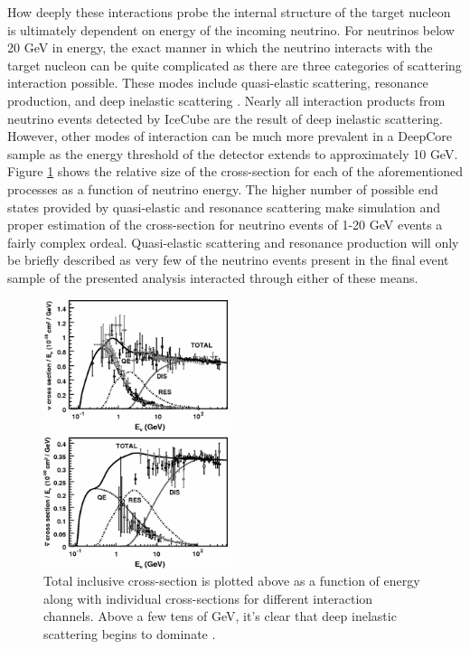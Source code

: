 \documentclass{gatech-thesis}
\begin{document}
How deeply these interactions probe the internal structure of the target nucleon is ultimately dependent on energy of the incoming neutrino. For neutrinos below 20 GeV in energy, the exact manner in which the neutrino interacts with the target nucleon can be quite complicated as there are three categories of scattering interaction possible. These modes include quasi-elastic scattering, resonance production, and deep inelastic scattering \cite{2012RvMP...84.1307F}. Nearly all interaction products from neutrino events detected by IceCube are the result of deep inelastic scattering. However, other modes of interaction can be much more prevalent in a DeepCore sample as the energy threshold of the detector extends to approximately 10 GeV. Figure \ref{fig:neutrino_scattering} shows the relative size of the cross-section for each of the aforementioned processes as a function of neutrino energy. The higher number of possible end states provided by quasi-elastic and resonance scattering make simulation and proper estimation of the cross-section for neutrino events of 1-20 GeV events a fairly complex ordeal. Quasi-elastic scattering and resonance production will only be briefly described as very few of the neutrino events present in the final event sample of the presented analysis interacted through either of these means.

\begin{figure}
  \begin{center}
    \includegraphics[width=0.48\textwidth,keepaspectratio]{neutrino_nucelon_crosssections.png}
  \end{center}
  \caption{Total inclusive cross-section is plotted above as a function of energy along with individual cross-sections for different interaction channels. Above a few tens of GeV, it's clear that deep inelastic scattering begins to dominate \cite{2012RvMP...84.1307F}.}
  \label{fig:neutrino_scattering}
\end{figure}
\end{document}
